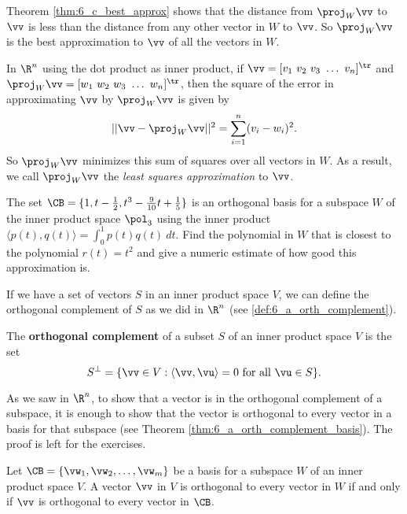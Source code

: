 Theorem \ref{thm:6_c_best_approx} shows that the distance from $\proj_W \vv$ to $\vv$ is less than the distance from any other vector in $W$ to $\vv$. So $\proj_W \vv$ is the best approximation to $\vv$ of all the vectors in $W$.

In $\R^n$ using the dot product as inner product, if $\vv = [v_1 \ v_2 \ v_3 \ \ldots \ v_n]^{\tr}$ and $\proj_W \vv =  [w_1 \ w_2 \ w_3 \ \ldots \ w_n]^{\tr}$, then the square of the error in approximating $\vv$ by $\proj_W \vv$ is given by
\[|| \vv - \proj_W \vv ||^2 = \sum_{i=1}^n (v_i - w_i)^2.\]
So $\proj_W \vv$ minimizes this sum of squares over all vectors in $W$. As a result, we call $\proj_W \vv$ the \emph{least squares approximation} to $\vv$.


\begin{activity} The set $\CB = \{1, t-\frac{1}{2}, t^3-\frac{9}{10}t+\frac{1}{5}\}$ is an orthogonal basis for a subspace $W$ of the inner product space $\pol_3$ using the inner product $\langle p(t), q(t) \rangle = \int_0^1 p(t)q(t) \ dt$. Find the polynomial in $W$ that is closest to the polynomial $r(t) = t^2$ and give a numeric estimate of how good this approximation is.


\end{activity}



If we have a set of vectors $S$ in an inner product space $V$, we can define the orthogonal complement of $S$ as we did in $\R^n$ (see \ref{def:6_a_orth_complement}).

\begin{definition} The \textbf{orthogonal complement} of a subset $S$ of an inner product space $V$ is the set
\[S^{\perp} = \{\vv \in V : \langle \vv, \vu \rangle = 0 \text{ for all } \vu \in S\}.\]
\end{definition}

As we saw in $\R^n$, to show that a vector is in the orthogonal complement of a subspace, it is enough to show that the vector is orthogonal to every vector in a basis for that subspace (see Theorem \ref{thm:6_a_orth_complement_basis}). The proof is left for the exercises. 

\begin{theorem} \label{thm:6_c_orth_complement_basis} Let $\CB = \{\vw_1, \vw_2, \ldots, \vw_m\}$ be a basis for a subspace $W$ of an inner product space $V$. A vector $\vv$ in $V$ is orthogonal to every vector in $W$ if and only if $\vv$ is orthogonal to every vector in $\CB$.
\end{theorem}


